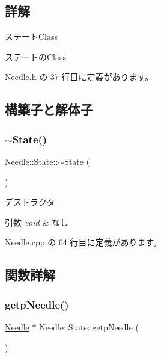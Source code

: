 \subsection{詳解}
ステート\+Class 

ステートの\+Class 

 Needle.\+h の 37 行目に定義があります。



\subsection{構築子と解体子}
\mbox{\label{class_needle_1_1_state_a5d90c3976391f5173fd2d9960cdfa157}} 
\subsubsection{\texorpdfstring{$\sim$\+State()}{~State()}}
{\footnotesize\ttfamily Needle\+::\+State\+::$\sim$\+State (\begin{DoxyParamCaption}{ }\end{DoxyParamCaption})\hspace{0.3cm}{\ttfamily [virtual]}}



デストラクタ 


\begin{DoxyParams}{引数}
{\em void} & なし \\
\hline
\end{DoxyParams}


 Needle.\+cpp の 64 行目に定義があります。



\subsection{関数詳解}
\mbox{\label{class_needle_1_1_state_a8e3a82791c1242b2a5ef4b16071be09b}} 
\subsubsection{\texorpdfstring{getp\+Needle()}{getpNeedle()}}
{\footnotesize\ttfamily \mbox{\hyperlink{class_needle}{Needle}} $\ast$ Needle\+::\+State\+::getp\+Needle (\begin{DoxyParamCaption}{ }\end{DoxyParamCaption})}



